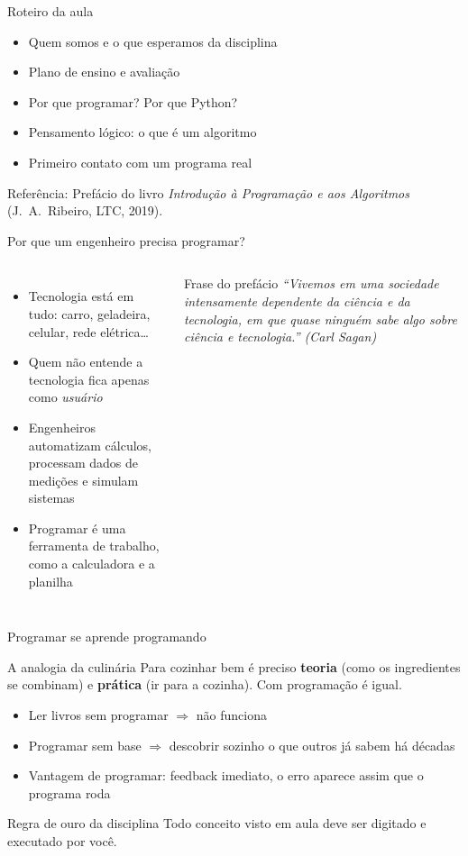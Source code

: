 \documentclass[aspectratio=169,10pt,t]{beamer}
\begin{document}
\capa

\begin{frame}{Roteiro da aula}
  \begin{itemize}
    \item Quem somos e o que esperamos da disciplina
    \item Plano de ensino e avaliação
    \item Por que programar? Por que Python?
    \item Pensamento lógico: o que é um \alert{algoritmo}
    \item Primeiro contato com um programa real
  \end{itemize}
  \vfill
  {\footnotesize Referência: Prefácio do livro \emph{Introdução à Programação e aos Algoritmos} (J.~A.~Ribeiro, LTC, 2019).}
\end{frame}

\begin{frame}{Por que um engenheiro precisa programar?}
  \begin{columns}[T]
    \begin{itemize}
      \item Tecnologia está em tudo: carro, geladeira, celular, rede elétrica\ldots
      \item Quem não entende a tecnologia fica apenas como \emph{usuário}
      \item Engenheiros automatizam cálculos, processam dados de medições e simulam sistemas
      \item Programar é uma ferramenta de trabalho, como a calculadora e a planilha
    \end{itemize}
    \begin{exampleblock}{Frase do prefácio}
      \itshape ``Vivemos em uma sociedade intensamente dependente da ciência e da tecnologia, em que quase ninguém sabe algo sobre ciência e tecnologia.'' (Carl Sagan)
    \end{exampleblock}
  \end{columns}
\end{frame}

\begin{frame}{Programar se aprende programando}
  \begin{block}{A analogia da culinária}
    Para cozinhar bem é preciso \textbf{teoria} (como os ingredientes se combinam) e \textbf{prática} (ir para a cozinha). Com programação é igual.
  \end{block}
  \begin{itemize}
    \item Ler livros sem programar \(\Rightarrow\) não funciona
    \item Programar sem base \(\Rightarrow\) descobrir sozinho o que outros já sabem há décadas
    \item Vantagem de programar: \alert{feedback imediato}, o erro aparece assim que o programa roda
  \end{itemize}
  \begin{alertblock}{Regra de ouro da disciplina}
    Todo conceito visto em aula deve ser digitado e executado por você.
  \end{alertblock}
\end{frame}
\end{document}
